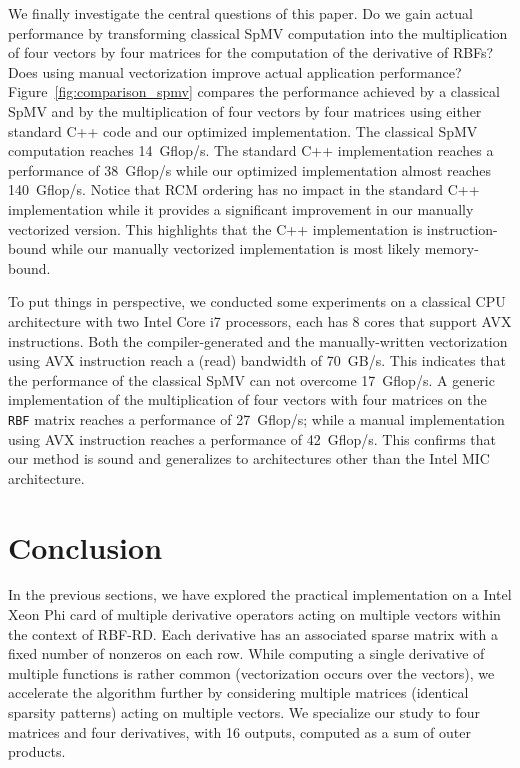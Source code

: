 \documentclass[10pt,conference,compsocconf]{IEEEtran}
\begin{document}
We finally investigate the central questions of this paper. Do we gain
actual performance by transforming classical SpMV computation into the
multiplication of four vectors by four matrices for the computation of the
derivative of RBFs? Does using manual vectorization improve actual
application performance? Figure~\ref{fig:comparison_spmv} compares the
performance achieved by a classical SpMV and by the multiplication of
four vectors by four matrices using either standard C++ code and our
optimized implementation. The
classical SpMV computation reaches 14~Gflop/s. 
The standard C++ implementation reaches a performance of 38~Gflop/s while our
optimized implementation almost reaches 140~Gflop/s. 
Notice that 
RCM ordering has no impact in the standard C++ implementation while it
provides a significant improvement in our manually vectorized
version. This highlights that the C++ implementation is instruction-bound
while our manually vectorized implementation is most likely 
memory-bound. 

To put things in perspective, we conducted some experiments on a
classical CPU architecture with two Intel Core i7 processors, each has 8
cores that support AVX instructions. Both the compiler-generated and
the manually-written vectorization using AVX instruction reach a
(read) bandwidth of 70~GB/s. This indicates that the performance of
the classical SpMV can not overcome 17~Gflop/s. A generic
implementation of the multiplication of four vectors with four matrices on
the {\tt RBF} matrix reaches a performance of 27~Gflop/s; while a
manual implementation using AVX instruction reaches a performance of
42~Gflop/s. This confirms that our method is sound and generalizes to
architectures other than the Intel MIC architecture.

\vspace{-0.5em}
\section{Conclusion}
\label{sec:ccl}

In the previous sections, we have explored the practical
implementation on a Intel Xeon Phi card of multiple derivative
operators acting on multiple vectors within the context of
RBF-RD. Each derivative has an associated sparse matrix with a fixed
number of nonzeros on each row. While computing a single derivative of
multiple functions is rather common (vectorization occurs over the
vectors), we accelerate the algorithm further by considering multiple
matrices (identical sparsity patterns) acting on multiple vectors. 
We specialize our study to four matrices and four derivatives,
with 16 outputs, computed as a sum of outer products.
\end{document}

